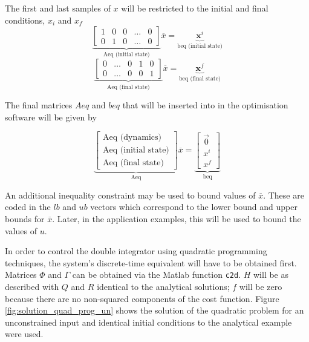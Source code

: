 \par The first and last samples of $x$ will be restricted to the initial and final conditions, $x_i$ and $x_f$
\begin{equation}
    \label{eq:quad_prog_Aeq_init}
    \underbrace{\begin{bmatrix} 
        1 & 0 & 0 & \ldots & 0 \\
        0 & 1 & 0 & \ldots & 0 
    \end{bmatrix}}_\text{Aeq (initial state)}
    \overline{x} = \underbrace{\mathbf{x}^i}_\text{beq (initial state)}
\end{equation}
\begin{equation}
    \label{eq:quad_prog_Aeq_final}
    \underbrace{\begin{bmatrix} 
        0 & \ldots & 0 & 1 & 0 \\
        0 & \ldots & 0 & 0 & 1 
    \end{bmatrix}}_\text{Aeq (final state)}
    \overline{x} = \underbrace{\mathbf{x}^f}_\text{beq (final state)}
\end{equation}

\par The final matrices $Aeq$ and $beq$ that will be inserted into in the optimisation software will be given by

\begin{equation}
    \label{eq:quad_prog_Aeq_total}
    \underbrace{\begin{bmatrix}
        \text{Aeq (dynamics)} \\ \text{Aeq (initial state)} \\ \text{Aeq (final state)}
        \end{bmatrix}}_\text{Aeq}
    \overline{x} =
    \underbrace{\begin{bmatrix}
        \vec{0} \\ x^i \\ x^f
        \end{bmatrix}}_\text{beq}
\end{equation}

\par An additional inequality constraint may be used to bound values of $\overline{x}$. These are coded in the $lb$ and $ub$ vectors which correspond to the lower bound and upper bounds for $\overline{x}$. Later, in the application examples, this will be used to bound the values of $u$.


\par In order to control the double integrator using quadratic programming techniques, the system's discrete-time equivalent will have to be obtained first. Matrices $\Phi$ and $\Gamma$ can be obtained via the Matlab function \texttt{c2d}. $H$ will be as described with $Q$ and $R$ identical to the analytical solutions; $f$ will be zero because there are no non-squared components of the cost function. Figure \ref{fig:solution_quad_prog_un} shows the solution of the quadratic problem for an unconstrained input and identical initial conditions to the analytical example were used.

